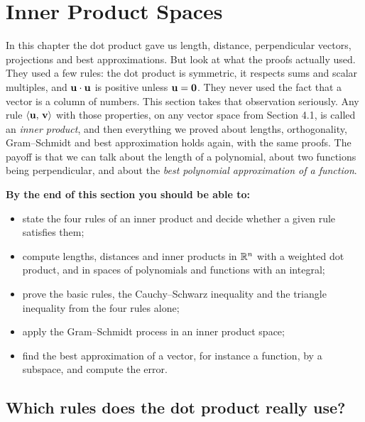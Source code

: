 \documentclass[11pt]{article}
\begin{document}
\section{Inner Product Spaces}

\begin{guide}
In this chapter the dot product gave us length, distance, perpendicular vectors, projections and best approximations. But look at what the proofs actually used. They used a few rules: the dot product is symmetric, it respects sums and scalar multiples, and $\mathbf{u}\cdot\mathbf{u}$ is positive unless $\mathbf{u}=\mathbf{0}$. They never used the fact that a vector is a column of numbers. This section takes that observation seriously. Any rule $\langle \mathbf{u},\,\mathbf{v}\rangle$ with those properties, on any vector space from Section 4.1, is called an \emph{inner product}, and then everything we proved about lengths, orthogonality, Gram--Schmidt and best approximation holds again, with the same proofs. The payoff is that we can talk about the length of a polynomial, about two functions being perpendicular, and about the \emph{best polynomial approximation of a function}.
\end{guide}

\textbf{By the end of this section you should be able to:}
\begin{itemize}
  \item state the four rules of an inner product and decide whether a given rule satisfies them;
  \item compute lengths, distances and inner products in $\mathbb{R}^n$ with a weighted dot product, and in spaces of polynomials and functions with an integral;
  \item prove the basic rules, the Cauchy--Schwarz inequality and the triangle inequality from the four rules alone;
  \item apply the Gram--Schmidt process in an inner product space;
  \item find the best approximation of a vector, for instance a function, by a subspace, and compute the error.
\end{itemize}

\subsection*{Which rules does the dot product really use?}
\end{document}
